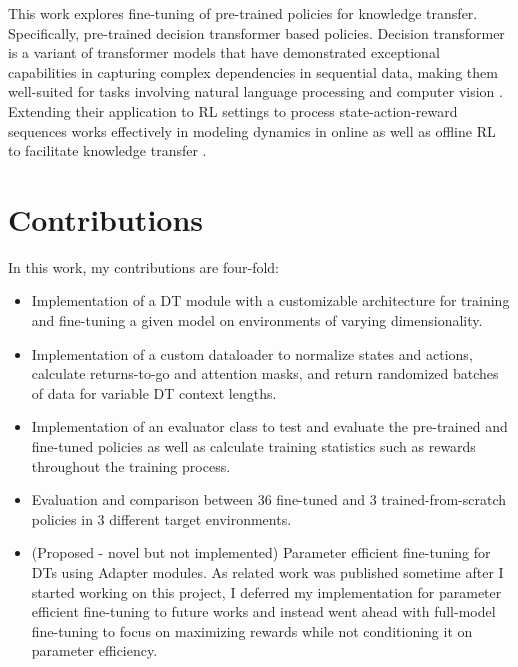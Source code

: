 \documentclass[10pt,a4paper]{article}
\begin{document}
This work explores fine-tuning of pre-trained policies for knowledge 
transfer. Specifically, pre-trained decision transformer based policies. 
Decision transformer \cite{chen2021decision} is a variant of transformer 
models \cite{vaswani2017attention} that have demonstrated exceptional 
capabilities in capturing complex dependencies in sequential data, making 
them well-suited for tasks involving natural language processing 
\cite{vaswani2017attention} and computer vision \cite{dosovitskiy2020image}. 
Extending their application to RL settings to process state-action-reward 
sequences works effectively in modeling dynamics in online \cite{zheng2022online} 
as well as offline \cite{meng2021offline, furuta2021generalized} RL to 
facilitate knowledge transfer \cite{lee2022multi, xu2023hyper}.

\section{Contributions}
In this work, my contributions are four-fold:
\begin{itemize}
    \item Implementation of a DT module with a customizable architecture for training and fine-tuning a given model on environments of varying dimensionality.
    \item Implementation of a custom dataloader to normalize states and actions, calculate returns-to-go and attention masks, and return randomized batches of data for variable DT context lengths.
    \item Implementation of an evaluator class to test and evaluate the pre-trained and fine-tuned policies as well as calculate training statistics such as rewards throughout the training process.
    \item Evaluation and comparison between 36 fine-tuned and 3 trained-from-scratch policies in 3 different target environments.
    \item (Proposed - novel but not implemented) Parameter efficient fine-tuning for DTs using Adapter \cite{houlsby2019parameter} modules. 
            As related work \cite{xu2023hyper} was published sometime after I started working on 
            this project, I deferred my implementation for parameter efficient fine-tuning to 
            future works and instead went ahead with full-model fine-tuning to focus on maximizing 
            rewards while not conditioning it on parameter efficiency.
\end{itemize}
\end{document}
